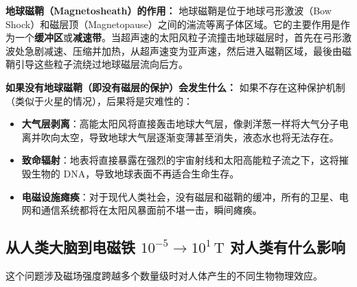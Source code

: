 \documentclass[11pt]{article}
\begin{document}
\textbf{地球磁鞘（Magnetosheath）的作用：}
地球磁鞘是位于地球弓形激波（Bow Shock）和磁层顶（Magnetopause）之间的湍流等离子体区域。它的主要作用是作为一个\textbf{缓冲区}或\textbf{减速带}。当超声速的太阳风粒子流撞击地球磁层时，首先在弓形激波处急剧减速、压缩并加热，从超声速变为亚声速，然后进入磁鞘区域，最後由磁鞘引导这些粒子流绕过地球磁层流向后方。

\textbf{如果没有地球磁鞘（即没有磁层的保护）会发生什么：}
如果不存在这种保护机制（类似于火星的情况），后果将是灾难性的：
\begin{itemize}
    \item \textbf{大气层剥离}：高能太阳风将直接轰击地球大气层，像剥洋葱一样将大气分子电离并吹向太空，导致地球大气层逐渐变薄甚至消失，液态水也将无法存在。
    \item \textbf{致命辐射}：地表将直接暴露在强烈的宇宙射线和太阳高能粒子流之下，这将摧毁生物的 DNA，导致地球表面不再适合生命生存。
    \item \textbf{电磁设施瘫痪}：对于现代人类社会，没有磁层和磁鞘的缓冲，所有的卫星、电网和通信系统都将在太阳风暴面前不堪一击，瞬间瘫痪。
\end{itemize}

\subsection{从人类大脑到电磁铁 $10^{-5} \rightarrow 10^1\,\text{T}$ 对人类有什么影响}

这个问题涉及磁场强度跨越多个数量级时对人体产生的不同生物物理效应。
\end{document}
